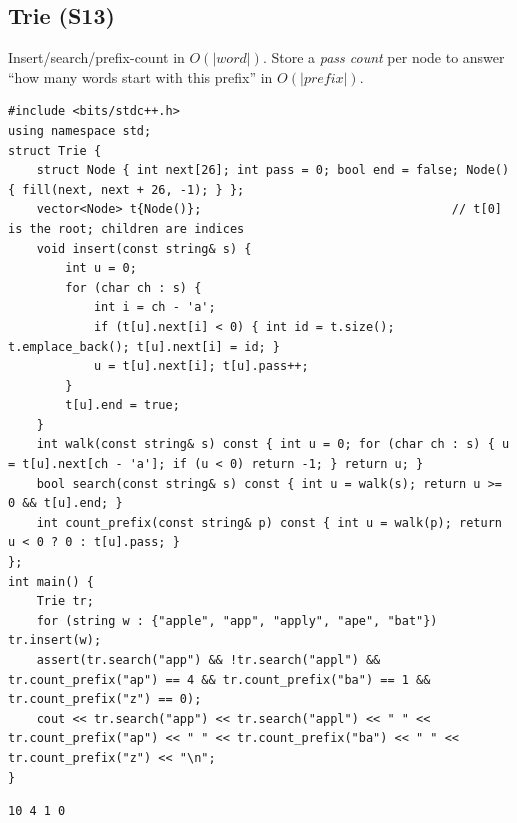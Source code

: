 \documentclass[10pt,a4paper,openany,oneside]{report}
\begin{document}
\subsection{Trie (S13)}
\begin{srcbox}
Insert/search/prefix-count in $O(|word|)$. Store a \emph{pass count} per node to answer ``how many words start with this prefix'' in $O(|prefix|)$.
\end{srcbox}
\begin{lstlisting}[language={[11]C++}]
#include <bits/stdc++.h>
using namespace std;
struct Trie {
    struct Node { int next[26]; int pass = 0; bool end = false; Node() { fill(next, next + 26, -1); } };
    vector<Node> t{Node()};                                   // t[0] is the root; children are indices
    void insert(const string& s) {
        int u = 0;
        for (char ch : s) {
            int i = ch - 'a';
            if (t[u].next[i] < 0) { int id = t.size(); t.emplace_back(); t[u].next[i] = id; }
            u = t[u].next[i]; t[u].pass++;
        }
        t[u].end = true;
    }
    int walk(const string& s) const { int u = 0; for (char ch : s) { u = t[u].next[ch - 'a']; if (u < 0) return -1; } return u; }
    bool search(const string& s) const { int u = walk(s); return u >= 0 && t[u].end; }
    int count_prefix(const string& p) const { int u = walk(p); return u < 0 ? 0 : t[u].pass; }
};
int main() {
    Trie tr;
    for (string w : {"apple", "app", "apply", "ape", "bat"}) tr.insert(w);
    assert(tr.search("app") && !tr.search("appl") && tr.count_prefix("ap") == 4 && tr.count_prefix("ba") == 1 && tr.count_prefix("z") == 0);
    cout << tr.search("app") << tr.search("appl") << " " << tr.count_prefix("ap") << " " << tr.count_prefix("ba") << " " << tr.count_prefix("z") << "\n";
}
\end{lstlisting}
\begin{lstlisting}[style=out,title={Answer: captured output}]
10 4 1 0
\end{lstlisting}
\end{document}
